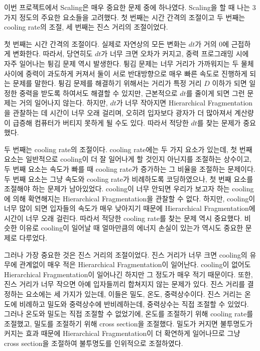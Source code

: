 \documentclass{gshs-hutech}
\begin{document}
이번 프로젝트에서 Scaling은 매우 중요한 문제 중에 하나였다. Scaling을 할 때 나는 3가지 정도의 주요한 요소들을 고려했다. 첫 번째는 시간 간격의 조절이고 두 번째는 cooling rate의 조절, 세 번째는 진스 거리의 조절이었다.

첫 번째는 시간 간격의 조절이다. 실제로 자연상의 모든 변화는 $dt$가 거의 0에 근접하게 변화한다. 따라서, 당연히도 $dt$가 너무 크면 오차가 커지고, 중력 프로그래밍 시에 자주 일어나는 튕김 문제 역시 발생한다. 튕김 문제는 너무 거리가 가까워지는 두 물체 사이에 중력이 과도하게 커져서 둘이 서로 반대방향으로 매우 빠른 속도로 진행하게 되는 문제를 말한다. 튕김 문제를 해결하기 위해서는 거리가 특정 거리 $D$ 이하가 되면 일정한 중력을 받도록 하여서도 해결할 수 있지만, 근본적으로 $dt$를 줄이게 되면 그런 문제는 거의 일어나지 않는다. 하지만, $dt$가 너무 작아지면 Hierarchical Fragmentation을 관찰하는 데 시간이 너무 오래 걸리며, 오히려 입자보다 광자가 더 많아져서 계산량이 급증해 컴퓨터가 버티지 못하게 될 수도 있다. 따라서 적당한 $dt$를 찾는 문제가 중요했다.

두 번째는 cooling rate의 조절이다. cooling rate에는 두 가지 요소가 있는데, 첫 번째 요소는 일반적으로 cooling이 더 잘 일어나게 할 것인지 아닌지를 조절하는 상수이고, 두 번째 요소는 속도가 빠를 때 cooling rate가 증가하는 그 비율을 조절하는 문제이다. 두 번째 요소는 그냥 속도와 cooling rate가 비례하도록 코딩하였으나, 첫 번째 요소를 조절해야 하는 문제가 남아있었다. cooling이 너무 안되면 우리가 보고자 하는 cooling에 의해 확연해지는 Hierarchical Fragmentation을 관찰할 수 없다. 하지만, cooling이 너무 많이 되면 입자들의 속도가 매우 낮아지기 때문에 Hierarchical Fragmentation에 시간이 너무 오래 걸린다. 따라서 적당한 cooling rate를 찾는 문제 역시 중요했다. 비슷한 이유로 cooling이 일어날 때 얼마만큼의 에너지 손실이 있는가 역시도 중요한 문제로 다루었다.

그러나 가장 중요한 것은 진스 거리의 조절이었다. 진스 거리가 너무 크면 cooling의 유무에 관계없이 매우 적은 Hierarchical Fragmentation이 일어난다. cooling이 없어도 Hierarchical Fragmentation이 일어나긴 하지만 그 정도가 매우 적기 때문이다. 또한, 진스 거리가 너무 작으면 아예 입자들끼리 합쳐지지 않는 문제가 있다. 진스 거리를 결정하는 요소에는 세 가지가 있는데, 이들은 밀도, 온도, 중력상수이다. 진스 거리는 온도에 비례하고 밀도와 중력상수에 반비례하는데, 중력상수는 직접 조절할 수 있었다. 그러나 온도와 밀도는 직접 조절할 수 없었기에, 온도를 조절하기 위해 cooling rate를 조절했고, 밀도를 조절하기 위해 cross section을 조절했다. 밀도가 커지면 불투명도가 커지는 효과 때문에 Hierarchical Fragmentation이 더 확연하게 일어나므로 그냥 cross section을 조절하여 불투명도를 인위적으로 조절하였다.  
\end{document}
